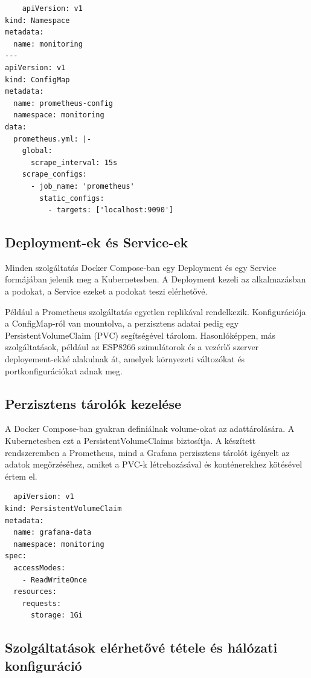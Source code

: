 \begin{lstlisting}
    apiVersion: v1
kind: Namespace
metadata:
  name: monitoring
---
apiVersion: v1
kind: ConfigMap
metadata:
  name: prometheus-config
  namespace: monitoring
data:
  prometheus.yml: |-
    global:
      scrape_interval: 15s
    scrape_configs:
      - job_name: 'prometheus'
        static_configs:
          - targets: ['localhost:9090']
\end{lstlisting}

\subsection{Deployment-ek és Service-ek}

Minden szolgáltatás Docker Compose-ban egy Deployment és egy Service formájában jelenik meg a Kubernetesben. 
A Deployment kezeli az alkalmazásban a podokat, a Service ezeket a podokat teszi elérhetővé.

Például a Prometheus szolgáltatás egyetlen replikával rendelkezik. Konfigurációja a ConfigMap-ról van mountolva, 
a perzisztens adatai pedig egy PersistentVolumeClaim (PVC) segítségével tárolom. Hasonlóképpen, más szolgáltatások, 
például az ESP8266 szimulátorok és a vezérlő szerver deployement-ekké alakulnak át, amelyek környezeti változókat 
és portkonfigurációkat adnak meg.

\subsection{Perzisztens tárolók kezelése}

A Docker Compose-ban gyakran definiálnak volume-okat az adattárolására. A Kubernetesben ezt a 
PersistentVolumeClaims biztosítja. A készített rendszeremben a Prometheus, mind a Grafana perzisztens 
tárolót igényelt az adatok megőrzéséhez, amiket a PVC-k létrehozásával és konténerekhez kötésével értem el.

\begin{lstlisting}
  apiVersion: v1
kind: PersistentVolumeClaim
metadata:
  name: grafana-data
  namespace: monitoring
spec:
  accessModes:
    - ReadWriteOnce
  resources:
    requests:
      storage: 1Gi
\end{lstlisting}

\subsection{Szolgáltatások elérhetővé tétele és hálózati konfiguráció}

